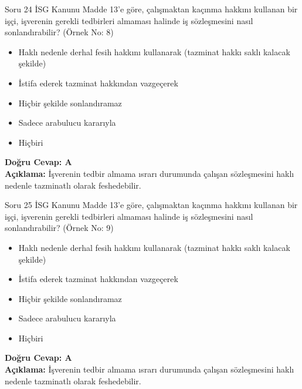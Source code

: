\documentclass[12pt,a4paper]{article}
\begin{document}
\begin{testcard}{Soru 24}
    İSG Kanunu Madde 13'e göre, çalışmaktan kaçınma hakkını kullanan bir işçi, işverenin gerekli tedbirleri almaması halinde iş sözleşmesini nasıl sonlandırabilir? (Örnek No: 8)
    \begin{itemize}
        \item[A)] Haklı nedenle derhal fesih hakkını kullanarak (tazminat hakkı saklı kalacak şekilde)
        \item[B)] İstifa ederek tazminat hakkından vazgeçerek
        \item[C)] Hiçbir şekilde sonlandıramaz
        \item[D)] Sadece arabulucu kararıyla
        \item[E)] Hiçbiri
    \end{itemize}
    \tcblower
    \textbf{Doğru Cevap: A} \\
    \textbf{Açıklama:} İşverenin tedbir almama ısrarı durumunda çalışan sözleşmesini haklı nedenle tazminatlı olarak feshedebilir.
\end{testcard}

\begin{testcard}{Soru 25}
    İSG Kanunu Madde 13'e göre, çalışmaktan kaçınma hakkını kullanan bir işçi, işverenin gerekli tedbirleri almaması halinde iş sözleşmesini nasıl sonlandırabilir? (Örnek No: 9)
    \begin{itemize}
        \item[A)] Haklı nedenle derhal fesih hakkını kullanarak (tazminat hakkı saklı kalacak şekilde)
        \item[B)] İstifa ederek tazminat hakkından vazgeçerek
        \item[C)] Hiçbir şekilde sonlandıramaz
        \item[D)] Sadece arabulucu kararıyla
        \item[E)] Hiçbiri
    \end{itemize}
    \tcblower
    \textbf{Doğru Cevap: A} \\
    \textbf{Açıklama:} İşverenin tedbir almama ısrarı durumunda çalışan sözleşmesini haklı nedenle tazminatlı olarak feshedebilir.
\end{testcard}
\end{document}
